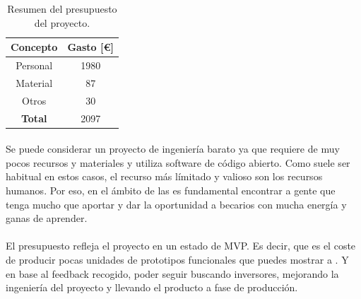 \begin{table}[hbt]
	\label{t:resumencostes}
	\centering
	\begin{tabular}{|c|c|}
		\hline
		\textbf{Concepto} & \textbf{Gasto [\euro]} \\
		\hline
		Personal & 1980 \\
		\hline
		Material & 87 \\
		\hline
		Otros & 30 \\
		\hline
		\textbf{Total} & 2097 \\
		\hline
	\end{tabular}
    \caption{Resumen del presupuesto del proyecto.}
\end{table}

\paragraph{}Se puede considerar un proyecto de ingeniería barato ya que requiere de
muy pocos recursos y materiales y utiliza software de código abierto. Como suele ser
habitual en estos casos, el recurso más límitado y valioso son los recursos humanos.
Por eso, en el ámbito de las  es fundamental encontrar a gente
que tenga mucho que aportar y dar la oportunidad a becarios con mucha energía y ganas
de aprender.

\paragraph{}El presupuesto refleja el proyecto en un estado de \gls{MVP}. Es decir,
que es el coste de producir pocas unidades de prototipos funcionales que puedes mostrar
a . Y en base al feedback recogido, poder seguir buscando inversores,
mejorando la ingeniería del proyecto y llevando el producto a fase de producción.


